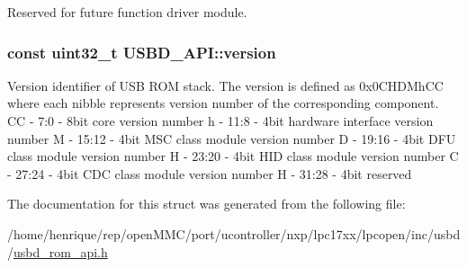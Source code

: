 Reserved for future function driver module. \hypertarget{structUSBD__API_a900209612d9df086dd044b630607955b}{
\subsubsection[{version}]{\setlength{\rightskip}{0pt plus 5cm}const uint32\-\_\-t U\-S\-B\-D\-\_\-\-A\-P\-I\-::version}}\label{structUSBD__API_a900209612d9df086dd044b630607955b}
Version identifier of U\-S\-B R\-O\-M stack. The version is defined as 0x0\-C\-H\-D\-Mh\-C\-C where each nibble represents version number of the corresponding component. C\-C -\/ 7\-:0 -\/ 8bit core version number h -\/ 11\-:8 -\/ 4bit hardware interface version number M -\/ 15\-:12 -\/ 4bit M\-S\-C class module version number D -\/ 19\-:16 -\/ 4bit D\-F\-U class module version number H -\/ 23\-:20 -\/ 4bit H\-I\-D class module version number C -\/ 27\-:24 -\/ 4bit C\-D\-C class module version number H -\/ 31\-:28 -\/ 4bit reserved 

The documentation for this struct was generated from the following file\-:\begin{DoxyCompactItemize}
\item 
/home/henrique/rep/open\-M\-M\-C/port/ucontroller/nxp/lpc17xx/lpcopen/inc/usbd/\hyperlink{usbd__rom__api_8h}{usbd\-\_\-rom\-\_\-api.\-h}\end{DoxyCompactItemize}
